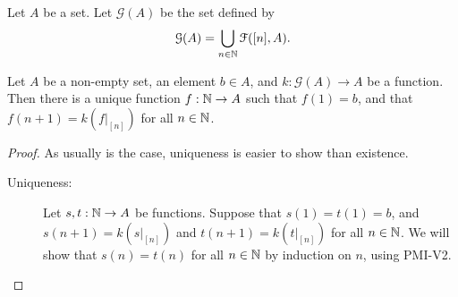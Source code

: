 \documentclass[a4paper,english,12pt]{article}
\begin{document}
\begin{defn} Let $A$ be a set. Let $\mathcal{G}(A)$ be the set defined by
\begin{align*}
\mathcal{G}(A)=\bigcup_{n \in \mathbb{N}}\mathcal{F}([n], A).
\end{align*}
\end{defn}
\begin{thm} Let $A$ be a non-empty set, an element $b \in A$, and $k: \mathcal{G}(A) \to A$ be a function. Then there is a unique function $f: \mathbb{N} \to A$ such that $f(1)=b$, and that $f(n + 1) = k(f|_{[n]})$ for all $n \in \mathbb{N}$.
\end{thm}
\begin{proof} As usually is the case, uniqueness is easier to show than existence.
\begin{description}
	\item[Uniqueness:] Let $s,t : \mathbb{N} \to A$ be functions. Suppose that $s(1) = t(1) = b$, and $s(n + 1) = k(s|_{[n]})$ and $t(n + 1) = k(t|_{[n]})$ for all $n \in \mathbb{N}$. We will show that $s(n) = t(n)$ for all $n \in \mathbb{N}$ by induction on $n$, using PMI-V2. 
	

\end{description}
\end{proof}
\end{document}
